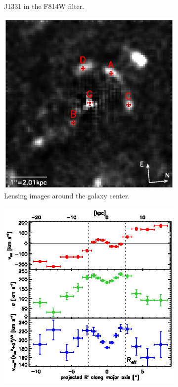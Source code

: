 \documentclass[useAMS,usenatbib]{mnras}
\begin{document}
\begin{figure}
\begin{subfigure}{.5\textwidth}
  \caption{J1331 in the F814W filter.}
  \label{fig:F814W}
\end{subfigure}
\begin{subfigure}{.5\textwidth}
  \centering
  \includegraphics[width=.9\linewidth]{fig/lens_imgpos.ps}
  \caption{Lensing images around the galaxy center.}
  \label{fig:lens_just_imgpos}
\end{subfigure}%
\begin{subfigure}{.5\textwidth}
  \centering
  \includegraphics[width=.9\linewidth]{fig/stellar_kinematics_data.ps}

\end{subfigure}
\end{figure}
\end{document}
